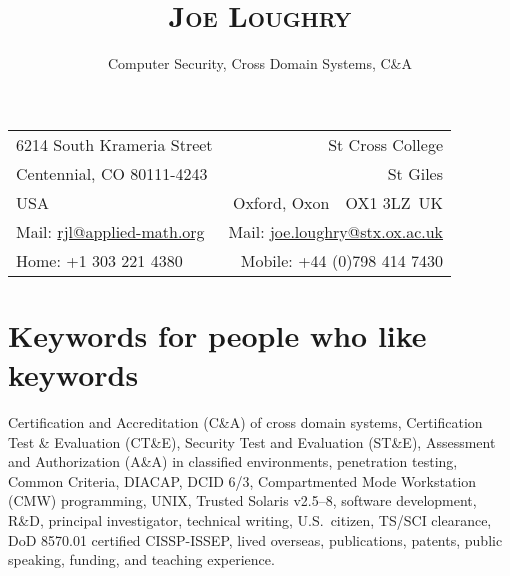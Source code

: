 \documentclass[letterpaper]{article}
\date{}
\title{\textsc{Joe Loughry}\vspace{-0.55cm}}
\author{Computer Security, Cross Domain Systems, C\&A}
\begin{document}
\maketitle
\thispagestyle{empty}

\vspace{-0.4in}\hspace{-0.1in}
\begin{tabular*}{\textwidth}{l@{\extracolsep{\fill}}r}
	6214 South Krameria Street       & St Cross College \\
	Centennial, CO 80111-4243        & St Giles \\
	USA                              & Oxford, Oxon\ \ OX1 3LZ\ UK \\
	Mail: \url{rjl@applied-math.org} & Mail: \url{joe.loughry@stx.ox.ac.uk} \\
	Home: +1 303 221 4380            & Mobile: +44 (0)798 414 7430 \\
\end{tabular*}

%
%


%
%

\section*{Keywords for people who like keywords} %

Certification and Accreditation (C\&A) of cross domain systems, Certification Test \&
Evaluation (CT\&E), Security Test and Evaluation (ST\&E), Assessment and Authorization (A\&A)
in classified environments, penetration testing,
Common Criteria, DIACAP, DCID 6/3, Compartmented Mode Workstation (CMW) programming,
UNIX, Trusted Solaris v2.5--8, software development, R\&D, principal investigator,
technical writing, U.S.\ citizen, TS/SCI clearance, DoD 8570.01 certified CISSP-ISSEP,
lived overseas, publications, patents, public speaking, funding, and teaching experience.
\end{document}
